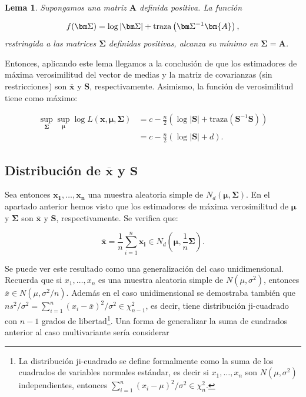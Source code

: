 \documentclass[
  a4paper,
  oneside]{scrbook}
\newtheorem{lemma}{Lema}[chapter]
\theoremstyle{definition}
\theoremstyle{definition}
\theoremstyle{definition}
\theoremstyle{definition}
\theoremstyle{remark}
\begin{document}
\begin{lemma}
\protect\hypertarget{lem:unnamed-chunk-15}{}\label{lem:unnamed-chunk-15}Supongamos una matriz \(\bm{A}\) definida positiva. La función

\[f(\bm\Sigma)=\log|\bm\Sigma|+{\textnormal{traza}}\left(\bm\Sigma^{-1}\bm{A}\right),\]
restringida a las matrices \(\bm\Sigma\) definidas positivas, alcanza su
mínimo en \(\bm\Sigma=\bm{A}\).
\end{lemma}

Entonces, aplicando este lema llegamos a la conclusión de que los
estimadores de máxima verosimilitud del vector de medias y la matriz de
covarianzas (sin restricciones) son \(\overline{\bm{x}}\) y \(\bm{S}\),
respectivamente. Asimismo, la función de verosimilitud tiene como
máximo:

\[\begin{aligned}
\sup_{\bm\Sigma}\sup_{\bm\mu}\log L(\bm{x},\bm{\mu},\bm\Sigma)
&= c - \frac{n}{2}
\left( \log |\bm{S}| + \mbox{traza} \left( \bm{S}^{-1} \bm{S} \right)\right)\\
&= c - \frac{n}{2} \left( \log |\bm{S}| + d\right).
\end{aligned}\]

\subsection{\texorpdfstring{Distribución de \(\overline{\bm{x}}\) y \(\bm{S}\)}{Distribución de \textbackslash overline\{\textbackslash bm\{x\}\} y \textbackslash bm\{S\}}}\label{distribucion-de-overline-bm-x-y-bm-s}

Sea entonces \(\bm{x_1},\ldots,\bm{x_n}\) una muestra aleatoria simple de
\(N_d(\bm\mu,\bm\Sigma)\). En el apartado anterior hemos visto que los
estimadores de máxima verosimilitud de \(\bm\mu\) y \(\bm\Sigma\) son
\(\overline{\bm{x}}\) y \(\bm{S}\), respectivamente. Se verifica que:

\[\overline{\bm{x}}=\frac{1}{n}\sum_{i=1}^n \bm{x_i} \in N_d\left(\bm{\mu},\frac{1}{n}\bm\Sigma\right).\]

Se puede ver este resultado como una generalización del caso
unidimensional. Recuerda que si \({x_1},\ldots,{x_n}\) es una muestra
aleatoria simple de \(N(\mu,\sigma^2)\), entonces
\(\overline{{x}}\in N\left({\mu},\sigma^2/n\right)\). Además en el caso
unidimensional se demostraba también que
\(ns^2/\sigma^2=\sum_{i=1}^n(x_i-\bar{x})^2/\sigma^2\in \chi_{n-1}^2\), es
decir, tiene distribución ji-cuadrado con \(n-1\) grados de libertad\footnote{La distribución ji-cuadrado se define formalmente como la suma de los cuadrados de variables normales estándar, es decir si \({x_1},\ldots,{x_n}\) son \(N(\mu,\sigma^2)\) independientes, entonces \(\sum_{i=1}^n(x_i-\mu)^2/\sigma^2\in \chi_{n}^2\).}.
Una forma de generalizar la suma de cuadrados anterior al caso
multivariante sería considerar
\end{document}
